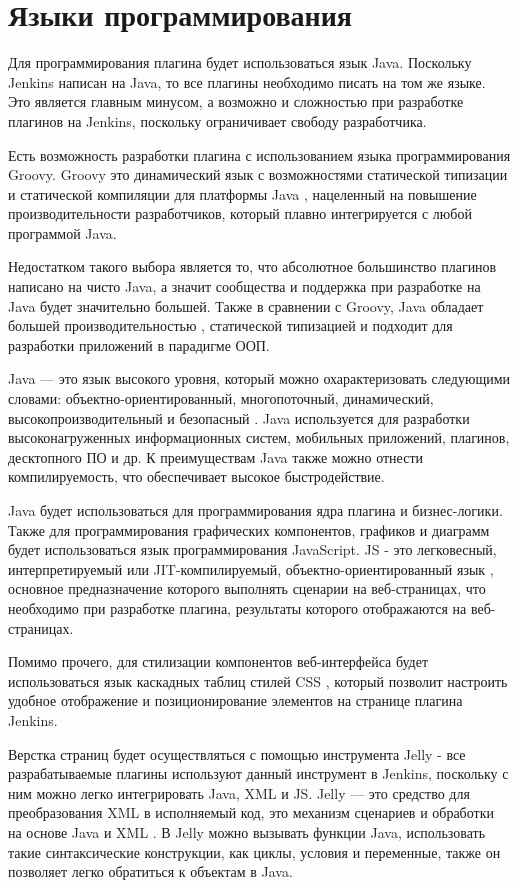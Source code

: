 \section{Языки программирования} \label{ch1:sec4}

Для программирования плагина будет использоваться язык Java. Поскольку Jenkins написан на Java, то все плагины необходимо писать на том же языке. Это является главным минусом, а возможно и сложностью при разработке плагинов на Jenkins, поскольку ограничивает свободу разработчика.

Есть возможность разработки плагина с использованием языка программирования Groovy. Groovy это динамический язык с возможностями статической типизации и статической компиляции для платформы Java \cite{groovy}, нацеленный на повышение производительности разработчиков, который плавно интегрируется с любой программой Java.

Недостатком такого выбора является то, что абсолютное большинство плагинов написано на чисто Java, а значит сообщества и поддержка при разработке на Java будет значительно большей. Также в сравнении с Groovy, Java обладает большей производительностью \cite{groovyvsjava}, статической типизацией и подходит для разработки приложений в парадигме ООП.

Java — это язык высокого уровня, который можно охарактеризовать следующими словами: объектно-ориентированный, многопоточный, динамический, высокопроизводительный и безопасный \cite{java}. Java используется для разработки высоконагруженных информационных систем, мобильных приложений, плагинов, десктопного ПО и др. К преимуществам Java также можно отнести компилируемость, что обеспечивает высокое быстродействие.

Java будет использоваться для программирования ядра плагина и бизнес-логики. Также для программирования графических компонентов, графиков и диаграмм будет использоваться язык программирования JavaScript. JS - это легковесный, интерпретируемый или JIT-компилируемый, объектно-ориентированный язык \cite{js}, основное предназначение которого выполнять сценарии на веб-страницах, что необходимо при разработке плагина, результаты которого отображаются на веб-страницах.

Помимо прочего, для стилизации компонентов веб-интерфейса будет использоваться язык каскадных таблиц стилей CSS \cite{css}, который позволит настроить удобное отображение и позиционирование элементов на странице плагина Jenkins. 

Верстка страниц будет осуществляться с помощью инструмента Jelly - все разрабатываемые плагины используют данный инструмент в Jenkins, поскольку с ним можно легко интегрировать Java, XML и JS. Jelly — это средство для преобразования XML в исполняемый код, это механизм сценариев и обработки на основе Java и XML \cite{jelly}. В Jelly можно вызывать функции Java, использовать такие синтаксические конструкции, как циклы, условия и переменные, также он позволяет легко обратиться к объектам в Java.

